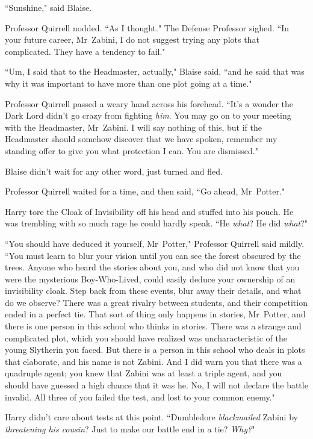 ``Sunshine," said Blaise.

Professor Quirrell nodded. ``As I thought." The Defense Professor sighed. ``In your future career, Mr~Zabini, I do not suggest trying any plots that complicated. They have a tendency to fail."

``Um, I said that to the Headmaster, actually," Blaise said, ``and he said that was why it was important to have more than one plot going at a time."

Professor Quirrell passed a weary hand across his forehead. ``It's a wonder the Dark Lord didn't go crazy from fighting \emph{him}. You may go on to your meeting with the Headmaster, Mr~Zabini. I will say nothing of this, but if the Headmaster should somehow discover that we have spoken, remember my standing offer to give you what protection I can. You are dismissed."

Blaise didn't wait for any other word, just turned and fled.

\later

Professor Quirrell waited for a time, and then said, ``Go ahead, Mr~Potter."

Harry tore the Cloak of Invisibility off his head and stuffed into his pouch. He was trembling with so much rage he could hardly speak. ``He \emph{what}? He did \emph{what}?"

``You should have deduced it yourself, Mr~Potter," Professor Quirrell said mildly. ``You must learn to blur your vision until you can see the forest obscured by the trees. Anyone who heard the stories about you, and who did not know that you were the mysterious Boy-Who-Lived, could easily deduce your ownership of an invisibility cloak. Step back from these events, blur away their details, and what do we observe? There was a great rivalry between students, and their competition ended in a perfect tie. That sort of thing only happens in stories, Mr~Potter, and there is one person in this school who thinks in stories. There was a strange and complicated plot, which you should have realized was uncharacteristic of the young Slytherin you faced. But there is a person in this school who deals in plots that elaborate, and his name is not Zabini. And I did warn you that there was a quadruple agent; you knew that Zabini was at least a triple agent, and you should have guessed a high chance that it was he. No, I will not declare the battle invalid. All three of you failed the test, and lost to your common enemy."

Harry didn't care about tests at this point. ``Dumbledore \emph{blackmailed} Zabini by \emph{threatening his cousin}? Just to make our battle end in a tie? \emph{Why?}"

